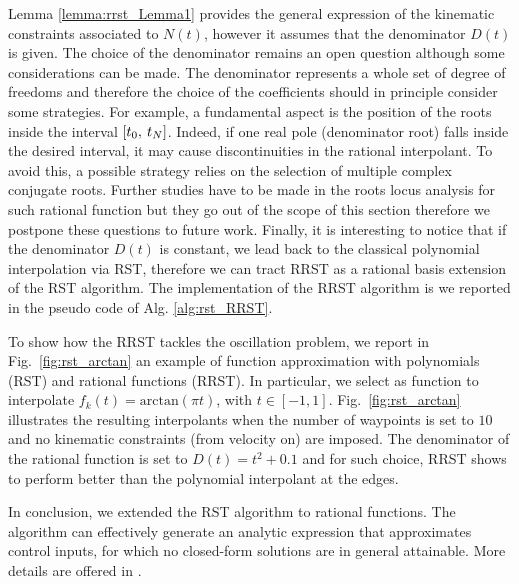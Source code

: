 Lemma \ref{lemma:rrst_Lemma1} provides the general expression of the kinematic constraints associated to $N(t)$, however it assumes that the denominator $D(t)$ is given. The choice of the denominator remains an open question although some considerations can be made. The denominator represents a whole set of degree of freedoms and therefore the choice of the coefficients should in principle consider some strategies. For example, a fundamental aspect is the position of the roots inside the interval $[t_0, \hspace{0.2em} t_N]$. Indeed, if one real pole (denominator root) falls inside the desired interval, it may cause discontinuities in the rational interpolant. To avoid this, a possible strategy relies on the selection of multiple complex conjugate roots. Further studies have to be made in the roots locus analysis for such rational function but they go out of the scope of this section therefore we postpone these questions to future work. Finally, it is interesting to notice that if the denominator $D(t)$ is constant, we lead back to the classical polynomial interpolation via RST, therefore we can tract RRST as a rational basis extension of the RST algorithm. The implementation of the RRST algorithm is we reported in the pseudo code of Alg. \ref{alg:rst_RRST}.

To show how the RRST tackles the oscillation problem, we report in Fig.~\ref{fig:rst_arctan} an example of function approximation with polynomials (RST) and rational functions (RRST). In particular, we select as function to interpolate $f_k(t)= \text{arctan}(\pi t)$, with $t\in [-1,1]$. Fig.~\ref{fig:rst_arctan} illustrates the resulting interpolants when the number of waypoints is set to $10$ and no kinematic constraints (from velocity on) are imposed. The denominator of the rational function is set to $D(t)=t^2+0.1$ and for such choice, RRST shows to perform better than the polynomial interpolant at the edges.

In conclusion, we extended the RST algorithm to rational functions. The algorithm can effectively generate an analytic expression that approximates control inputs, for which no closed-form solutions are in general attainable. More details are offered in \cite{9525383}.


